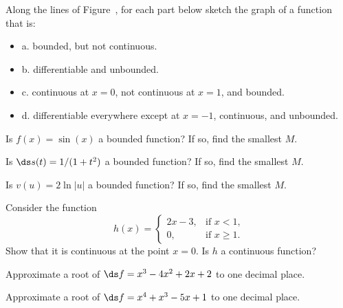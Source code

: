 \begin{exercises}

\begin{exercise} Along the lines of Figure~,
for each part below sketch the
 graph of a function that is:

\begin{itemize} %

  \item{a.} bounded, but not continuous.

  \item{b.} differentiable and unbounded.

  \item{c.} continuous at $x=0$, not continuous at $x=1$, and bounded.
  
  \item{d.} differentiable everywhere except at $x=-1$, continuous, and unbounded.

 \end{itemize}
\end{exercise}

\begin{exercise} Is $f(x)=\sin(x)$ a bounded function?  If so, find the smallest $M$.
\end{exercise}

\begin{exercise} Is $\ds s(t) = 1/(1+t^2)$ a bounded function?  If so, find the
smallest $M$.
\end{exercise}

 \begin{exercise} Is $v(u) = 2\ln|u|$ a bounded function?  If so, find the smallest $M$.
\end{exercise}

 \begin{exercise} Consider the function 
$$h(x) = \begin{cases}
2x - 3, & \mbox{if $x<1$,} \\
0, & \mbox{if $x\geq 1$.}
\end{cases}$$
Show that it is continuous at the point $x=0$.  Is $h$ a continuous function?
\end{exercise}

\begin{exercise}
Approximate a root of $\ds f=x^3-4x^2+2x+2$ to one decimal place.
\end{exercise}

\begin{exercise}
Approximate a root of $\ds f=x^4+x^3-5x+1$ to one decimal place.
\end{exercise}

\end{exercises}
